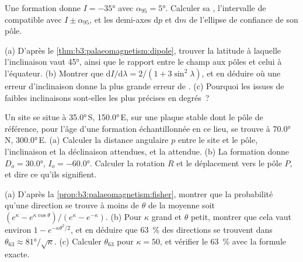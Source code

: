 \begin{exercise}[$\star\star$]\label{exo:b3:palaeomagnetism:9}
Une formation donne $I = \ang{-35}$ avec $\alpha_{95} = \ang{5}$. Calculer sa
, l'intervalle de  compatible avec $I \pm \alpha_{95}$,
et les demi-axes $\mathrm dp$ et $\mathrm dm$ de l'ellipse de confiance de son
pôle.
\end{exercise}

\begin{exercise}[$\star\star\star$]\label{exo:b3:palaeomagnetism:10}
(a) D'après le \cref{thm:b3:palaeomagnetism:dipole}, trouver la latitude à laquelle
l'inclinaison vaut \ang{45}, ainsi que le rapport entre le champ aux pôles et celui
à l'équateur. (b) Montrer que $\mathrm dI/\mathrm d\lambda = 2/(1 + 3\sin^2\lambda)$,
et en déduire où une erreur d'inclinaison donne la plus grande erreur de
. (c) Pourquoi les  issues de faibles inclinaisons sont-elles les plus
précises en degrés~?
\end{exercise}

\begin{exercise}[$\star\star\star$]\label{exo:b3:palaeomagnetism:11}
Un site se situe à \ang{35.0}\,S, \ang{150.0}\,E, sur une plaque stable dont le pôle de
référence, pour l'âge d'une formation échantillonnée en ce lieu, se trouve à \ang{70.0}\,N,
\ang{300.0}\,E. (a) Calculer la distance angulaire $p$ entre le site et le pôle,
l'inclinaison et la déclinaison attendues, et la  attendue.
(b) La formation donne $D_o = \ang{30.0}$, $I_o = \ang{-60.0}$. Calculer la
rotation $R$ et le déplacement vers le pôle $P$, et dire ce qu'ils signifient.
\end{exercise}

\begin{exercise}[$\star\star\star$]\label{exo:b3:palaeomagnetism:12}
(a) D'après la \cref{prop:b3:palaeomagnetism:fisher}, montrer que la probabilité
qu'une direction se trouve à moins de $\theta$ de la moyenne soit $(e^\kappa -
e^{\kappa\cos\theta})/(e^\kappa - e^{-\kappa})$. (b) Pour $\kappa$ grand et
$\theta$ petit, montrer que cela vaut environ $1 - e^{-\kappa\theta^2/2}$, et en déduire
que \qty{63}{\percent} des directions se trouvent dans $\theta_{63} \approx
\ang{81}/\sqrt\kappa$. (c) Calculer $\theta_{63}$ pour $\kappa = 50$, et vérifier le
\qty{63}{\percent} avec la formule exacte.
\end{exercise}

